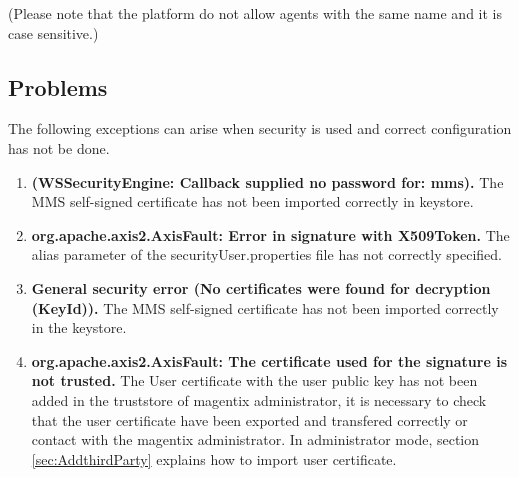 (Please note that the platform do not allow agents with the same name and it is case sensitive.)

\subsection{Problems}
The following  exceptions can arise when security is used and correct configuration has not be done.
\begin{enumerate}

\item  \textbf{(WSSecurityEngine: Callback supplied no password for: mms).}
The MMS self-signed certificate has not been imported correctly in keystore.
\item  \textbf{org.apache.axis2.AxisFault: Error in signature with X509Token.}
The alias parameter  of the  securityUser.properties file has not correctly specified.
\item  \textbf{General security error (No certificates were found for decryption (KeyId)).}
The MMS self-signed certificate has not been imported correctly in the keystore.
\item  \textbf{org.apache.axis2.AxisFault: The certificate used for the signature is not trusted.}
The User certificate with the user public key has not been added in the truststore of magentix administrator, it is necessary to check that 
the user certificate have been exported and transfered correctly or contact with the magentix administrator.
In administrator mode, section \ref{sec:AddthirdParty} explains how to import user certificate. 
\end{enumerate}